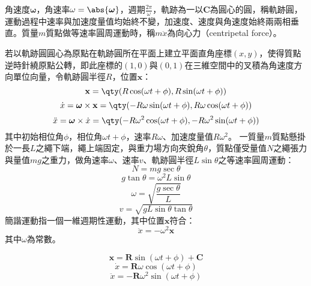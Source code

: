 \documentclass[a4paper,12pt]{article}
\begin{document}
角速度$\boldsymbol{\omega}$，角速率$\omega=\abs{\boldsymbol{\omega}}$，週期$\frac{2\pi}{\omega}$，軌跡為一以$\mathbf{C}$為圓心的圓，稱軌跡圓，運動過程中速率與加速度量值均始終不變，加速度、速度與角速度始終兩兩相垂直。質量$m$質點做等速率圓周運動時，稱$m\ddot{x}$為向心力（centripetal force）。

若以軌跡圓圓心為原點在軌跡圓所在平面上建立平面直角座標$(x,y)$，使得質點逆時針繞原點公轉，即此座標的$(1,0)$與$(0,1)$在三維空間中的叉積為角速度方向單位向量，令軌跡圓半徑$R$，位置$\mathbf{x}$：
\[\mathbf{x}=\qty(R\cos(\omega t+\phi),R\sin(\omega t+\phi))\]
\[\dot{x}=\boldsymbol{\omega}\times\mathbf{x}=\qty(-R\omega\sin(\omega t+\phi),R\omega\cos(\omega t+\phi))\]
\[\ddot{x}=\boldsymbol{\omega}\times\dot{x}=\qty(-R\omega^2\cos(\omega t+\phi),-R\omega^2\sin(\omega t+\phi))\]
其中初始相位角$\phi$，相位角$\omega t+\phi$，速率$R\omega$、加速度量值$R\omega^2$。 
一質量$m$質點懸掛於一長$L$之繩下端，繩上端固定，與重力場方向夾銳角$\theta$，質點僅受量值$N$之繩張力與量值$mg$之重力，做角速率$\omega$、速率$v$、軌跡圓半徑$L\sin\theta$之等速率圓周運動：
\[N=mg\sec\theta\]
\[g\tan\theta=\omega^2L\sin\theta\]
\[\omega=\sqrt{\frac{g\sec\theta}{L}}\]
\[v=\sqrt{gL\sin\theta\tan\theta}\]
簡諧運動指一個一維週期性運動，其中位置$\mathbf{x}$符合：
\[\ddot{x}=-\omega^2\mathbf{x}\]
其中$\omega$為常數。

\[\mathbf{x}=\mathbf{R}\sin(\omega t+\phi)+\mathbf{C}\]
\[\dot{x}=\mathbf{R}\omega\cos(\omega t+\phi)\]
\[\ddot{x}=-\mathbf{R}\omega^2\sin(\omega t+\phi)\]
\end{document}
